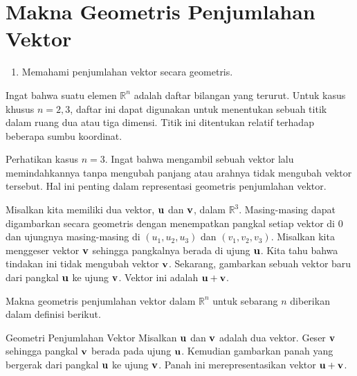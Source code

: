 \section{Makna Geometris Penjumlahan Vektor}

\begin{outcome}

\begin{enumerate}
\item[A.] Memahami penjumlahan vektor secara geometris.
\end{enumerate}
\end{outcome}

Ingat bahwa suatu elemen $\mathbb{R}^{n}$ adalah daftar bilangan yang terurut.
Untuk kasus khusus $n=2,3$, daftar ini dapat digunakan untuk
menentukan sebuah titik dalam ruang dua atau tiga dimensi. Titik ini
ditentukan relatif terhadap beberapa sumbu koordinat.

Perhatikan kasus $n=3$. Ingat bahwa mengambil sebuah vektor lalu memindahkannya
tanpa mengubah panjang atau arahnya tidak mengubah
vektor tersebut. Hal ini penting dalam representasi geometris penjumlahan
vektor.

Misalkan kita memiliki dua vektor, $\mathbf{u}$ dan $\mathbf{v}$, dalam
$\mathbb{R}^{3}$. Masing-masing dapat digambarkan secara geometris dengan menempatkan
pangkal setiap vektor di $0$ dan ujungnya masing-masing di $\left( u_{1}, u_{2},
u_{3}\right)$ dan $\left( v_{1}, v_{2}, v_{3}\right) $.
Misalkan kita menggeser vektor $\mathbf{v}$ sehingga pangkalnya
berada di ujung $\mathbf{u}$. Kita tahu bahwa tindakan ini tidak mengubah
vektor $\mathbf{v}$. Sekarang, gambarkan sebuah vektor baru dari pangkal
$\mathbf{u}$ ke ujung $\mathbf{v}$. Vektor ini adalah
$\mathbf{u}+\mathbf{v}$.

Makna geometris penjumlahan vektor dalam $\mathbb{R}^n$ untuk sebarang $n$ diberikan dalam
definisi berikut.

\begin{definition}{Geometri Penjumlahan Vektor}\label{def:geometryofvectoraddition}
Misalkan $\mathbf{u}$ dan $\mathbf{v}$ adalah dua vektor. Geser $\mathbf{v}$ sehingga
pangkal $\mathbf{v}$ berada pada ujung $\mathbf{u}$. Kemudian gambarkan
panah yang bergerak dari pangkal $\mathbf{u}$ ke ujung $\mathbf{v}$.
Panah ini merepresentasikan vektor $\mathbf{u}+\mathbf{v}$.

\begin{center}
\par{}\label{fig:RnVectorsAdditionMeaning-tikz01}%

\end{center}
\end{definition}

